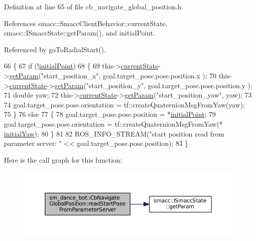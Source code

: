 Definition at line 65 of file cb\+\_\+navigate\+\_\+global\+\_\+position.\+h.



References smacc\+::\+Smacc\+Client\+Behavior\+::current\+State, smacc\+::\+I\+Smacc\+State\+::get\+Param(), and initial\+Point.



Referenced by go\+To\+Radial\+Start().


\begin{DoxyCode}
66   \{
67     \textcolor{keywordflow}{if} (!\hyperlink{classsm__dance__bot_1_1CbNavigateGlobalPosition_a9b81342ca5492d3b9724c488c1f39f4f}{initialPoint})
68     \{
69       this->\hyperlink{classsmacc_1_1SmaccClientBehavior_af76fc9b877542ed5caf033f820c107d0}{currentState}->\hyperlink{classsmacc_1_1ISmaccState_abbb3a24b912c6e8de28f7b86123b6357}{getParam}(\textcolor{stringliteral}{"start\_position\_x"}, goal.target\_pose.pose.position.x
      );
70       this->\hyperlink{classsmacc_1_1SmaccClientBehavior_af76fc9b877542ed5caf033f820c107d0}{currentState}->\hyperlink{classsmacc_1_1ISmaccState_abbb3a24b912c6e8de28f7b86123b6357}{getParam}(\textcolor{stringliteral}{"start\_position\_y"}, goal.target\_pose.pose.position.y
      );
71       \textcolor{keywordtype}{double} yaw;
72       this->\hyperlink{classsmacc_1_1SmaccClientBehavior_af76fc9b877542ed5caf033f820c107d0}{currentState}->\hyperlink{classsmacc_1_1ISmaccState_abbb3a24b912c6e8de28f7b86123b6357}{getParam}(\textcolor{stringliteral}{"start\_position\_yaw"}, yaw);
73 
74       goal.target\_pose.pose.orientation = tf::createQuaternionMsgFromYaw(yaw);
75     \}
76     \textcolor{keywordflow}{else}
77     \{
78       goal.target\_pose.pose.position = *\hyperlink{classsm__dance__bot_1_1CbNavigateGlobalPosition_a9b81342ca5492d3b9724c488c1f39f4f}{initialPoint};
79       goal.target\_pose.pose.orientation = tf::createQuaternionMsgFromYaw(*
      \hyperlink{classsm__dance__bot_1_1CbNavigateGlobalPosition_ad7ac13ee1b0f1a5dfdd47639930ab34c}{initialYaw});
80     \}
81 
82     ROS\_INFO\_STREAM(\textcolor{stringliteral}{"start position read from parameter server: "} << goal.target\_pose.pose.position);
83   \}
\end{DoxyCode}


Here is the call graph for this function\+:
\nopagebreak
\begin{figure}[H]
\begin{center}
\leavevmode
\includegraphics[width=350pt]{classsm__dance__bot_1_1CbNavigateGlobalPosition_a81b78925b3ab8a426f471cb74d0b9756_cgraph}
\end{center}
\end{figure}




